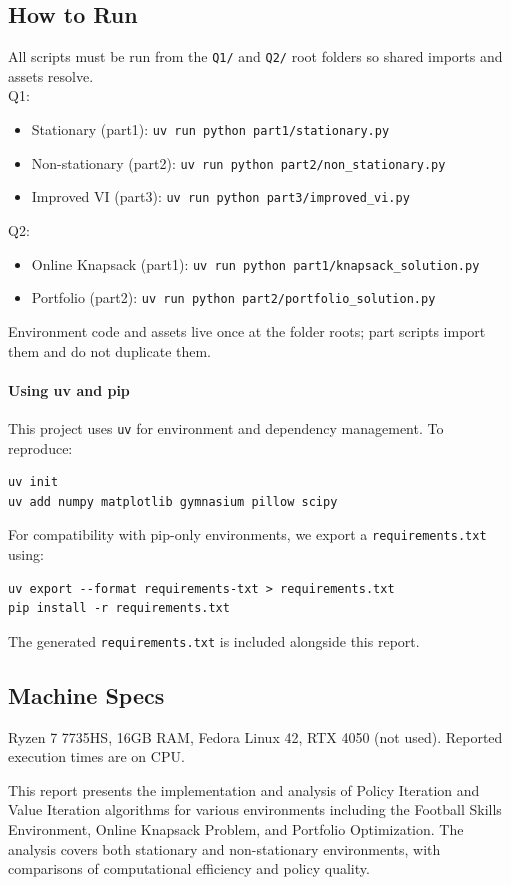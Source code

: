 \documentclass[10pt,a4paper]{article}
\begin{document}
\subsection*{How to Run}
All scripts must be run from the \texttt{Q1/} and \texttt{Q2/} root folders so shared imports and assets resolve.
\\Q1:
\begin{itemize}
  \item Stationary (part1): \texttt{uv run python part1/stationary.py}
  \item Non-stationary (part2): \texttt{uv run python part2/non\_stationary.py}
  \item Improved VI (part3): \texttt{uv run python part3/improved\_vi.py}
\end{itemize}
Q2:
\begin{itemize}
  \item Online Knapsack (part1): \texttt{uv run python part1/knapsack\_solution.py}
  \item Portfolio (part2): \texttt{uv run python part2/portfolio\_solution.py}
\end{itemize}
Environment code and assets live once at the folder roots; part scripts import them and do not duplicate them.

\paragraph{Using uv and pip}
This project uses \texttt{uv} for environment and dependency management. To reproduce:
\begin{verbatim}
uv init
uv add numpy matplotlib gymnasium pillow scipy
\end{verbatim}
For compatibility with pip-only environments, we export a \texttt{requirements.txt} using:
\begin{verbatim}
uv export --format requirements-txt > requirements.txt
pip install -r requirements.txt
\end{verbatim}
The generated \texttt{requirements.txt} is included alongside this report.

\subsection*{Machine Specs}
Ryzen 7 7735HS, 16GB RAM, Fedora Linux 42, RTX 4050 (not used). Reported execution times are on CPU.

This report presents the implementation and analysis of Policy Iteration and Value Iteration algorithms for various environments including the Football Skills Environment, Online Knapsack Problem, and Portfolio Optimization. The analysis covers both stationary and non-stationary environments, with comparisons of computational efficiency and policy quality.
\end{document}
